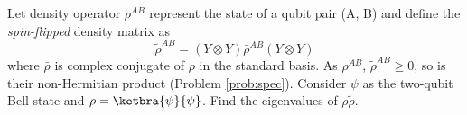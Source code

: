 \begin{myexercise}
Let density operator $\rho^{AB}$ represent the state of a qubit pair (A, B) and define the {\it spin-flipped} density matrix as 
\begin{equation}
    \tilde{\rho}^{AB} = (Y\otimes Y) \bar{\rho}^{AB}(Y\otimes Y)
\end{equation}
where $\bar{\rho}$ is complex conjugate of $\rho$ in the standard basis.  As $\rho^{AB}$, $\tilde{\rho}^{AB}\geq 0$, so is their non-Hermitian product (Problem \eqref{prob:spec}). Consider $\psi$ as the two-qubit Bell state and $\rho = \ketbra{\psi}{\psi}$.  Find the eigenvalues of $\rho \tilde{\rho}$. 
\end{myexercise}




